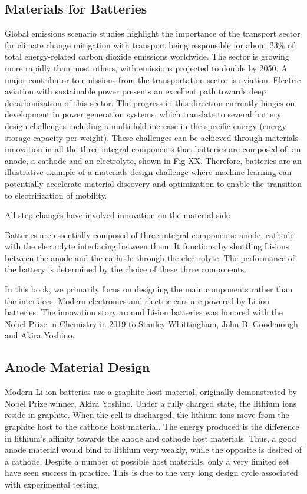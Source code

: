 \documentclass[book.tex]{subfiles}
\begin{document}
\subsection{Materials for Batteries} 

Global emissions scenario studies highlight the importance of the transport sector for climate change mitigation \cite{edenhofer2015climate} with transport being responsible for about 23\% of total energy-related carbon dioxide emissions worldwide\cite{fischedick2014industry}. The sector is growing more rapidly than most others, with emissions projected
to double by 2050. A major contributor to emissions from the transportation sector is aviation. Electric aviation with sustainable power presents an excellent path towards deep decarbonization of this sector. The progress in this direction currently hinges on development in power generation systems, which translate to several battery design challenges\cite{bills2020performance,fredericks2018performance} including a multi-fold increase in the specific energy (energy storage capacity per weight). These challenges can be achieved through materials innovation in all the three integral components that batteries are composed of: an anode, a cathode and an electrolyte, shown in Fig XX. Therefore, batteries are an illustrative example of a materials design challenge where machine learning can potentially accelerate material discovery and optimization to enable the transition to electrification of mobility. 

All step changes have involved innovation on the material side

Batteries are essentially composed of three integral components: anode, cathode with the electrolyte interfacing between them.  It functions by shuttling Li-ions between the anode and the cathode through the electrolyte.   The performance of the battery is determined by the choice of these three components.

In this book, we primarily focus on designing the main components rather than the interfaces.  Modern electronics and electric cars are powered by Li-ion batteries.  The innovation story around Li-ion batteries was honored with the Nobel Prize in Chemistry in 2019 to Stanley Whittingham, John B. Goodenough and Akira Yoshino.

\subsection{Anode Material Design}
Modern Li-ion batteries use a graphite host material, originally demonstrated by Nobel Prize winner, Akira Yoshino.   Under a fully charged state, the lithium ions reside in graphite.  When the cell is discharged, the lithium ions move from the graphite host to the cathode host material.  The energy produced is the difference in lithium's affinity towards the anode and cathode host materials.  Thus, a good anode material would bind to lithium very weakly, while the opposite is desired of a cathode.  Despite a number of possible host materials, only a very limited set have seen success in practice.  This is due to the very long design cycle associated with experimental testing.   
\end{document}
